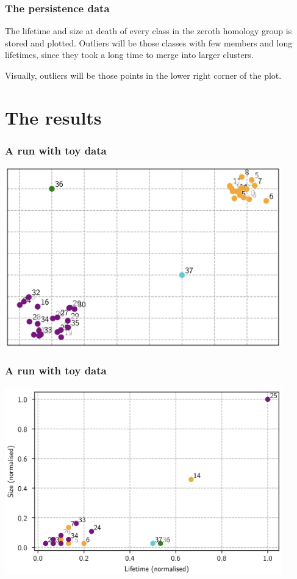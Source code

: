 \documentclass[xcolor=dvipsnames]{beamer}
\begin{document}
\begin{frame}
	\frametitle{The persistence data}
	The lifetime and size at death of every class in the zeroth homology group is stored and
	plotted. Outliers will be those classes with few members and long lifetimes, since they
	took a long time to merge into larger clusters. 

	\pause

	Visually, outliers will be those points in the lower right corner of the plot. 
\end{frame}

\section{The results}
\begin{frame}
	\frametitle{A run with toy data}
	\centering
	\includegraphics[width=0.9\textwidth]{beamer/clusters}
\end{frame}

\begin{frame}
	\frametitle{A run with toy data}
	\centering
	\includegraphics[width=0.9\textwidth]{beamer/toy-results}
\end{frame}
\end{document}
